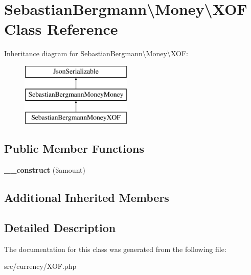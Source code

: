\hypertarget{classSebastianBergmann_1_1Money_1_1XOF}{}\section{Sebastian\+Bergmann\textbackslash{}Money\textbackslash{}X\+O\+F Class Reference}
\label{classSebastianBergmann_1_1Money_1_1XOF}
Inheritance diagram for Sebastian\+Bergmann\textbackslash{}Money\textbackslash{}X\+O\+F\+:\begin{figure}[H]
\begin{center}
\leavevmode
\includegraphics[height=3.000000cm]{classSebastianBergmann_1_1Money_1_1XOF}
\end{center}
\end{figure}
\subsection*{Public Member Functions}
\begin{DoxyCompactItemize}
\item 
\hypertarget{classSebastianBergmann_1_1Money_1_1XOF_a6fb0853687f8e2283c094a0930c6a374}{}{\bfseries \+\_\+\+\_\+construct} (\$amount)\label{classSebastianBergmann_1_1Money_1_1XOF_a6fb0853687f8e2283c094a0930c6a374}

\end{DoxyCompactItemize}
\subsection*{Additional Inherited Members}


\subsection{Detailed Description}


The documentation for this class was generated from the following file\+:\begin{DoxyCompactItemize}
\item 
src/currency/X\+O\+F.\+php\end{DoxyCompactItemize}
